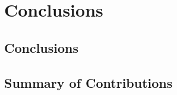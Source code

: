 
\chapter{Conclusions} %


\ifpdf
    \graphicspath{{X/figures/PNG/}{X/figures/PDF/}{X/figures/}}
\else
    \graphicspath{{X/figures/EPS/}{X/figures/}}
\fi


\section{Conclusions}

\section{Summary of Contributions}


